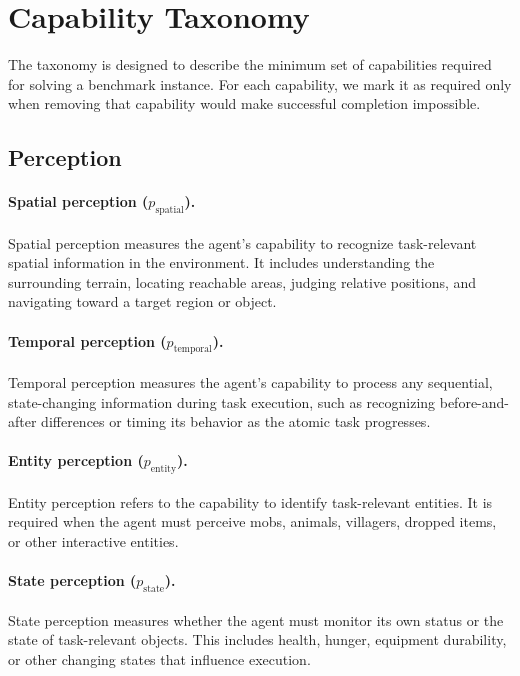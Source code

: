 \documentclass[11pt]{article}
\begin{document}
\appendix

\section{Capability Taxonomy}
\label{appendix: Capability Taxonomy}

The taxonomy is designed to describe the minimum set of capabilities required for solving a benchmark instance. 
For each capability, we mark it as required only when removing that capability would make successful completion impossible. 

\subsection{Perception}

\paragraph{Spatial perception ($p_{\mathrm{spatial}}$).}

Spatial perception measures the agent's capability to recognize task-relevant spatial information in the environment. 
It includes understanding the surrounding terrain, locating reachable areas, judging relative positions, and navigating toward a target region or object.

\paragraph{Temporal perception ($p_{\mathrm{temporal}}$).}
Temporal perception measures the agent's capability to process any sequential, state-changing information during task execution, such as recognizing before-and-after differences or timing its behavior as the atomic task progresses.

\paragraph{Entity perception ($p_{\mathrm{entity}}$).}
Entity perception refers to the capability to identify task-relevant entities. 
It is required when the agent must perceive mobs, animals, villagers, dropped items, or other interactive entities.

\paragraph{State perception ($p_{\mathrm{state}}$).}
State perception measures whether the agent must monitor its own status or the state of task-relevant objects. 
This includes health, hunger, equipment durability, or other changing states that influence execution.
\end{document}

